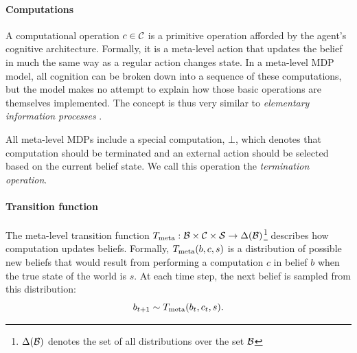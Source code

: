 

\paragraph{Computations}
A computational operation $c \in \mathcal{C}$ is a primitive operation afforded by the agent's cognitive architecture. Formally, it is a meta-level action that updates the belief in much the same way as a regular action changes state. In a meta-level MDP model, all cognition can be broken down into a sequence of these computations, but the model makes no attempt to explain how those basic operations are themselves implemented. The concept is thus very similar to \emph{elementary information processes} \citep{chase1978elementary,simon1979information,posner1982information,payne1988adaptive}. 

All meta-level MDPs include a special computation, $\bot$, which denotes that computation should be terminated and an external action should be selected based on the current belief state. We call this operation the \emph{termination operation}.

\paragraph{Transition function}
The meta-level transition function $T_{\text{meta}}: \mathcal{B} \times \mathcal{C} \times \mathcal{S} \rightarrow \Delta(\mathcal{B})$\footnote{$\Delta(\mathcal{B})$ denotes the set of all distributions over the set $\mathcal{B}$} describes how computation updates beliefs. Formally, $T_{\text{meta}}(b, c, s)$ is a distribution of possible new beliefs that would result from performing a computation $c$ in belief $b$ when the true state of the world is $s$. At each time step, the next belief is sampled from this distribution:
\begin{equation}
b_{t+1} \sim T_{\text{meta}}(b_t, c_t, s).
\end{equation}


